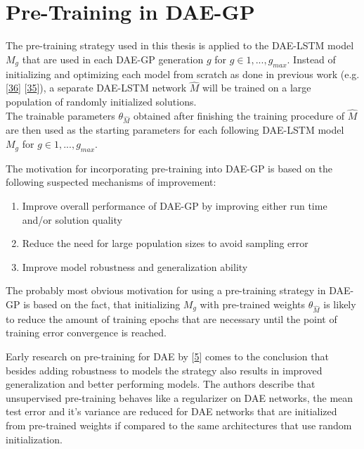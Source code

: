 \documentclass[
  11pt,
]{article}
\providecommand{\tightlist}{%
  \setlength{\itemsep}{0pt}\setlength{\parskip}{0pt}}
\begin{document}
\hypertarget{pre-training-in-dae-gp}{%
\section{Pre-Training in DAE-GP}\label{pre-training-in-dae-gp}}

The pre-training strategy used in this thesis is applied to the DAE-LSTM model \(M_g\) that are used in each DAE-GP generation \(g\) for \(g\in{1,...,g_{max}}\).
Instead of initializing and optimizing each model from scratch as done in previous work (e.g. {[}\protect\hyperlink{ref-dae-gp_2020_rtree}{36}{]} {[}\protect\hyperlink{ref-dae-gp_2022_symreg}{35}{]}), a separate DAE-LSTM network \(\hat{M}\) will be trained on a large population of randomly initialized solutions.\\

The trainable parameters \(\theta_{\hat{M}}\) obtained after finishing the training procedure of \(\hat{M}\) are then used as the starting parameters for each following DAE-LSTM model \(M_g\) for \(g\in{1,...,g_{max}}\).

The motivation for incorporating pre-training into DAE-GP is based on the following suspected mechanisms of improvement:

\begin{enumerate}
\def\labelenumi{\arabic{enumi}.}
\tightlist
\item
  Improve overall performance of DAE-GP by improving either run time and/or solution quality
\item
  Reduce the need for large population sizes to avoid sampling error
\item
  Improve model robustness and generalization ability
\end{enumerate}

The probably most obvious motivation for using a pre-training strategy in DAE-GP is based on the fact, that initializing \(M_g\) with pre-trained weights \(\theta_{\hat{M}}\) is likely to reduce the amount of training epochs that are necessary until the point of training error convergence is reached.

Early research on pre-training for DAE by {[}\protect\hyperlink{ref-pmlr-v5-erhan09a}{5}{]} comes to the conclusion that besides adding robustness to models the strategy also results in improved generalization and better performing models.
The authors describe that unsupervised pre-training behaves like a regularizer on DAE networks, the mean test error and it's variance are reduced for DAE networks that are initialized from pre-trained weights if compared to the same architectures that use random initialization.
\end{document}
